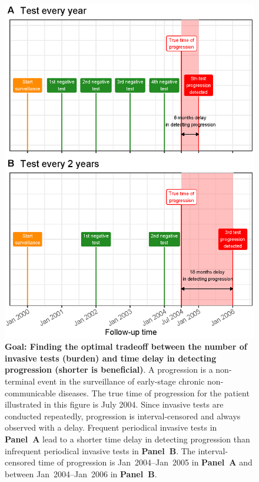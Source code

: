 \documentclass[useAMS, usenatbib, referee]{biom}
\begin{document}
\begin{figure}
\centerline{\includegraphics{delay_explanation.eps}}
\caption{\textbf{Goal: Finding the optimal tradeoff between the number of invasive tests (burden) and time delay in detecting progression (shorter is beneficial)}. A progression is a non-terminal event in the surveillance of early-stage chronic non-communicable diseases. The true time of progression for the patient illustrated in this figure is July 2004. Since invasive tests are conducted repeatedly, progression is interval-censored and always observed with a delay. Frequent periodical invasive tests in \textbf{Panel~A} lead to a shorter time delay in detecting progression than infrequent periodical invasive tests in \textbf{Panel~B}. The interval-censored time of progression is Jan~2004--Jan~2005 in \textbf{Panel~A} and between Jan~2004--Jan~2006 in \textbf{Panel~B}.} 
\label{fig:delay_explanation}
\end{figure}
\end{document}
